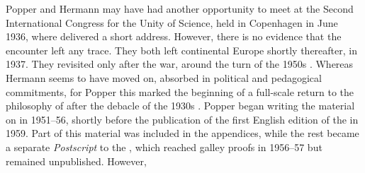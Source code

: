 Popper and Hermann may have had another opportunity to meet at the Second International Congress for the Unity of Science, held in Copenhagen in June 1936, where \citet{Hermann1936} delivered a short address. However, there is no evidence that the encounter left any trace. They both left continental Europe shortly thereafter, in 1937. They revisited \qm only after the war, around the turn of the 1950s \citep{Henry-Hermann1948,Popper1951}. Whereas Hermann seems to have moved on, absorbed in political and pedagogical commitments, for Popper this marked the beginning of a full-scale return to the philosophy of \qm after the debacle of the 1930s \citep{DelSanto2019}. Popper began writing the material on \qm in 1951--56, shortly before the publication of the first English edition of the \Lo in 1959. Part of this material was included in the appendices, while the rest became a separate \textit{Postscript} to the \Lo, which reached galley proofs in 1956--57 but remained unpublished. However, 

%



